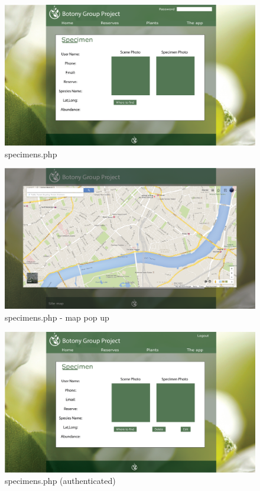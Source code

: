 \begin{landscape}
            \begin{figure}
                \centering
                \includegraphics[scale=0.4]{uiDesign/uiwebimages/specimen.png}
                \caption{specimens.php}
                \label{fig:specimen}
            \end{figure}
        
\begin{figure}
                \centering
                \includegraphics[scale=0.4]{uiDesign/uiwebimages/map.png}
                \caption{specimens.php - map pop up}
                \label{fig:map}
            \end{figure}

            \begin{figure}
                \centering
                \includegraphics[scale=0.4]{uiDesign/uiwebimages/specimenlogged.png}
                \caption{specimens.php (authenticated)}
                \label{fig:specimenslogged}
            \end{figure}


\end{landscape}
